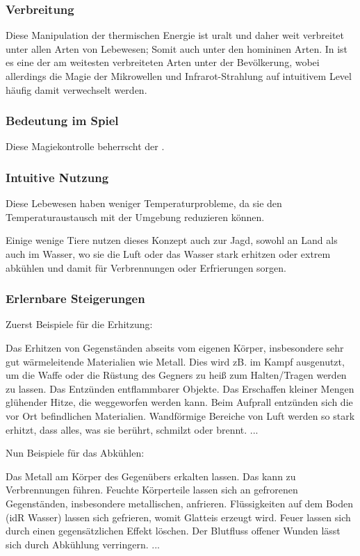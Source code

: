 \subsubsection{Verbreitung}
Diese Manipulation der thermischen Energie ist uralt und daher weit verbreitet unter allen Arten von Lebewesen; 
Somit auch unter den homininen Arten. 
In  ist es eine der am weitesten verbreiteten Arten unter der Bevölkerung, wobei allerdings die Magie der Mikrowellen und Infrarot-Strahlung auf intuitivem Level häufig damit verwechselt werden.

\subsubsection{Bedeutung im Spiel}
Diese Magiekontrolle beherrscht der .

\subsubsection{Intuitive Nutzung}
Diese Lebewesen haben weniger Temperaturprobleme, da sie den Temperaturaustausch mit der Umgebung reduzieren können.

Einige wenige Tiere nutzen dieses Konzept auch zur Jagd, sowohl an Land als auch im Wasser, wo sie die Luft oder das Wasser stark erhitzen oder extrem abkühlen und damit für Verbrennungen oder Erfrierungen sorgen.

\subsubsection{Erlernbare Steigerungen}
Zuerst Beispiele für die Erhitzung:
\begin{outline}
	\1 Das Erhitzen von Gegenständen abseits vom eigenen Körper, insbesondere sehr gut wärmeleitende Materialien wie Metall. Dies wird zB. im Kampf ausgenutzt, um die Waffe oder die Rüstung des Gegners zu heiß zum Halten/Tragen werden zu lassen.
	\1 Das Entzünden entflammbarer Objekte.
	\1 Das Erschaffen kleiner Mengen glühender Hitze, die weggeworfen werden kann. 
	Beim Aufprall entzünden sich die vor Ort befindlichen Materialien. 
	\1 Wandförmige Bereiche von Luft werden so stark erhitzt, dass alles, was sie berührt, schmilzt oder brennt.
	\1 ...
\end{outline}

Nun Beispiele für das Abkühlen:
\begin{outline}
	\1 Das Metall am Körper des Gegenübers erkalten lassen. Das kann zu Verbrennungen führen.
	\1 Feuchte Körperteile lassen sich an gefrorenen Gegenständen, insbesondere metallischen, anfrieren.
	\1 Flüssigkeiten auf dem Boden (idR Wasser) lassen sich gefrieren, womit Glatteis erzeugt wird.
	\1 Feuer lassen sich durch einen gegensätzlichen Effekt löschen.
	\1 Der Blutfluss offener Wunden lässt sich durch Abkühlung verringern.
	\1 ...
\end{outline}

